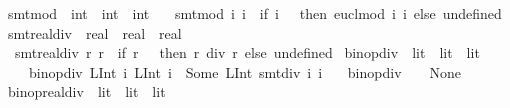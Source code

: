 \begin{isabellebody}
\isanewline
{}\isamarkupfalse%
\ smt{\isacharunderscore}{\kern0pt}mod\ {\isacharcolon}{\kern0pt}{\isacharcolon}{\kern0pt}\ {\isachardoublequoteopen}int\ {\isasymRightarrow}\ int\ {\isasymRightarrow}\ int{\isachardoublequoteclose}\ \isanewline
\ \ {\isachardoublequoteopen}smt{\isacharunderscore}{\kern0pt}mod\ i{}\ i{}\ {\isacharequal}{\kern0pt}\ {\isacharparenleft}{\kern0pt}if\ i{}\ {\isasymnoteq}\ {}\ then\ eucl{\isacharunderscore}{\kern0pt}mod\ i{}\ i{}\ else\ undefined{\isacharparenright}{\kern0pt}{\isachardoublequoteclose}\isanewline
\isanewline
{}\isamarkupfalse%
\ smt{\isacharunderscore}{\kern0pt}real{\isacharunderscore}{\kern0pt}div\ {\isacharcolon}{\kern0pt}{\isacharcolon}{\kern0pt}\ {\isachardoublequoteopen}real\ {\isasymRightarrow}\ real\ {\isasymRightarrow}\ real{\isachardoublequoteclose}\ \isanewline
\ \ {\isachardoublequoteopen}smt{\isacharunderscore}{\kern0pt}real{\isacharunderscore}{\kern0pt}div\ r{}\ r{}\ {\isacharequal}{\kern0pt}\ {\isacharparenleft}{\kern0pt}if\ r{}\ {\isasymnoteq}\ {}\ then\ r{}\ div\ r{}\ else\ undefined{\isacharparenright}{\kern0pt}{\isachardoublequoteclose}\isanewline
\isanewline
{}\isamarkupfalse%
\ binop{\isacharunderscore}{\kern0pt}div\ {\isacharcolon}{\kern0pt}{\isacharcolon}{\kern0pt}\ {\isachardoublequoteopen}lit\ {\isasymRightarrow}\ lit\ {\isasymrightharpoonup}\ lit{\isachardoublequoteclose}\isanewline
\ \ \isanewline
\ \ \ \ {\isachardoublequoteopen}binop{\isacharunderscore}{\kern0pt}div\ {\isacharparenleft}{\kern0pt}LInt\ i{}{\isacharparenright}{\kern0pt}\ {\isacharparenleft}{\kern0pt}LInt\ i{}{\isacharparenright}{\kern0pt}\ {\isacharequal}{\kern0pt}\ Some\ {\isacharparenleft}{\kern0pt}LInt\ {\isacharparenleft}{\kern0pt}smt{\isacharunderscore}{\kern0pt}div\ i{}\ i{}{\isacharparenright}{\kern0pt}{\isacharparenright}{\kern0pt}{\isachardoublequoteclose}\isanewline
\ \ {\isacharbar}{\kern0pt}\ {\isachardoublequoteopen}binop{\isacharunderscore}{\kern0pt}div\ {\isacharunderscore}{\kern0pt}\ {\isacharunderscore}{\kern0pt}\ {\isacharequal}{\kern0pt}\ None{\isachardoublequoteclose}\isanewline
\isanewline
{}\isamarkupfalse%
\ binop{\isacharunderscore}{\kern0pt}real{\isacharunderscore}{\kern0pt}div\ {\isacharcolon}{\kern0pt}{\isacharcolon}{\kern0pt}\ {\isachardoublequoteopen}lit\ {\isasymRightarrow}\ lit\ {\isasymrightharpoonup}\ lit{\isachardoublequoteclose}\isanewline

\end{isabellebody}
